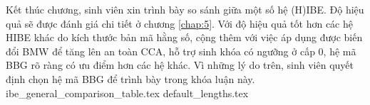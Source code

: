 \documentclass[class=report, crop=false]{standalone}
\begin{document}
		Kết thúc chương, sinh viên xin trình bày so sánh giữa một số hệ (H)IBE. Độ hiệu quả sẽ được đánh giá chi tiết ở chương \ref{chap:5}. Với độ hiệu quả tốt hơn các hệ HIBE khác do kích thước bản mã hằng số, cộng thêm với việc áp dụng được biến đổi BMW để tăng lên an toàn CCA, hỗ trợ sinh khóa có ngưỡng ở cấp 0, hệ mã BBG rõ ràng có ưu điểm hơn các hệ khác. Vì những lý do trên, sinh viên quyết định chọn hệ mã BBG để trình bày trong khóa luận này.
		\newpage
		{ibe_general_comparison_table.tex}
	{default_lengths.tex}
\end{document}
